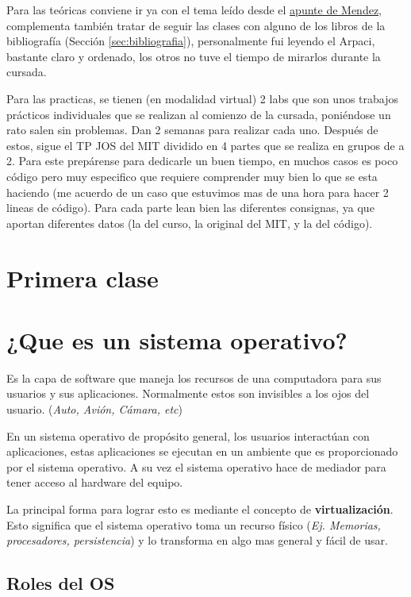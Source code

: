 \documentclass[titlepage,a4paper]{article}
\begin{document}
Para las teóricas conviene ir ya con el tema leído desde el \href{https://fisop.github.io/apunte/}{apunte de Mendez}, complementa también tratar de seguir las clases con alguno de los libros de la bibliografía (Sección \ref{sec:bibliografia}), personalmente fui leyendo el Arpaci, bastante claro y ordenado, los otros no tuve el tiempo de mirarlos durante la cursada.

Para las practicas, se tienen (en modalidad virtual) 2 labs que son unos trabajos prácticos individuales que se realizan al comienzo de la cursada, poniéndose un rato salen sin problemas. Dan 2 semanas para realizar cada uno.  Después de estos, sigue el TP JOS del MIT dividido en 4 partes que se realiza en grupos de a 2. Para este prepárense para dedicarle un buen tiempo, en muchos casos es poco código pero muy especifico que requiere comprender muy bien lo que se esta haciendo (me acuerdo de un caso que estuvimos mas de una hora para hacer 2 lineas de código). Para cada parte lean bien las diferentes consignas, ya que aportan diferentes datos (la del curso, la original del MIT, y la del código).

\newpage

\section*{Primera clase}
\section{¿Que es un sistema operativo?}

Es la capa de software que maneja los recursos de una computadora para sus usuarios y sus aplicaciones. Normalmente estos son invisibles a los ojos del usuario. (\textit{Auto, Avión, Cámara, etc})

En un sistema operativo de propósito general, los usuarios interactúan con aplicaciones, estas aplicaciones se ejecutan en un ambiente que es proporcionado por el sistema operativo. A su vez el sistema operativo hace de mediador para tener acceso al hardware del equipo.

La principal forma para lograr esto es mediante el concepto de \textbf{virtualización}. Esto significa que el sistema operativo toma un recurso físico (\textit{Ej. Memorias, procesadores, persistencia}) y lo transforma en algo mas general y fácil de usar.

\subsection*{Roles del OS}
\end{document}
